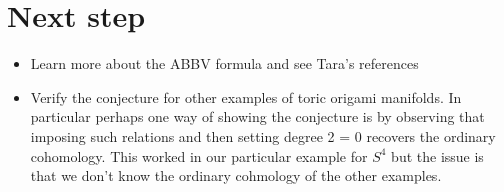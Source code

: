 \documentclass[12pt]{article}
\begin{document}
\section{Next step}
\begin{itemize}
    \item Learn more about the ABBV formula and see Tara's references
    \item Verify the conjecture for other examples of toric origami manifolds. In particular perhaps one way of showing the conjecture
    is by observing that imposing such relations and then setting degree 2 = 0 recovers the ordinary cohomology. This worked in our particular example
    for $S^4$ but the issue is that we don't know the ordinary cohmology of the other examples. 
\end{itemize}
\end{document}
